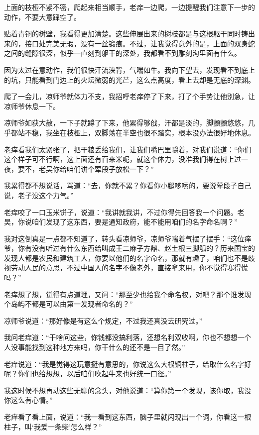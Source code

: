 上面的枝桠不紧不密，爬起来相当顺手，老痒一边爬，一边提醒我们注意下一步的动作，不要大意踩空了。

贴着青铜的树壁，我看得更加清楚。这些伸展出来的树枝都是与这根躯干同时铸出来的，接口处完美无瑕，没有一丝锻痕。不过，让我觉得意外的是，上面的双身蛇之间的缝隙很深，似乎一直刻到躯干的深处，我都看不到雕刻沟里面有什么。

因为太过在意动作，我们很快汗流浃背，气喘如牛。我向下望去，发现看不到底上的坑，只能看到门边上的火坛微弱的光芒，这么点高度，看上去却是无底的深渊。

爬了一会儿，凉师爷就体力不支，我招呼老痒停了下来，打了个手势让他别急，让凉师爷休息一下。

凉师爷如获大赦，一下子就蹲了下来，他累得够戗，汗都是淡的，脚颤颤悠悠，几乎都站不稳，我坐在枝桠上，双脚荡在半空也很不踏实，根本没办法很好地休息。

老痒看我们太紧张了，把干粮丢给我们，让我们嘴巴里嚼着，对我们说道：“你们这个样子可不行啊，这上面还有百来米呢，就这个体力，没准我们得在树上过一夜，要不，老吴你给咱们讲个荤段子放松一下？”

我累得都不想说话，骂道：“去，你就不累？你看你小腿哆嗦的，要说荤段子自己说，老子没这个力气。”

老痒咬了一口玉米饼子，说道：“我讲就我讲，不过你得先回答我一个问题。老吴，你说咱们发现了这东西，要是通知政府，能不能用咱们的名字命名啊？”

我对这倒真是一点都不知道了，转头看凉师爷，凉师爷喘着气摆了摆手：“这位痒爷，你有没有听过有什么东西给叫成王二麻子方鼎、赵土根三脚觚的？历来国宝的发现人都是农民和建筑工人，你要以他们的名字命名，那就有趣了，咱们也不是歧视劳动人民的意思，不过中国人的名字不像老外，直接拿来用，你不觉得寒得慌吗？”

老痒想了想，觉得有点道理，又问：“那至少也给我个命名权，对吧？那个谁发现个岛屿不都是可以由第一发现者命名的？”

凉师爷说道：“那好像是有这么个规定，不过我还真没去研究过。”

我问老痒道：“干啥问这些，你钱都没搞利落，还想名利双收啊，你也不想想一个人没事能找到这种地方来吗，你干什么的还不是一目了然。”

老痒说道：“我是觉得这玩意挺有意思的，你说这么大根铜柱子，给取什么名字好呢？你们也给想想，以后咱们吹起牛来也好统一口径。”

我这时候不想再动这些无聊的念头，对他说道：“算你第一个发现，该你取，我没你这么有心情。”

老痒看了看上面，说道：“我一看到这东西，脑子里就闪现出一个词，你看这一根柱子，叫‘我爱一条柴’怎么样？”

